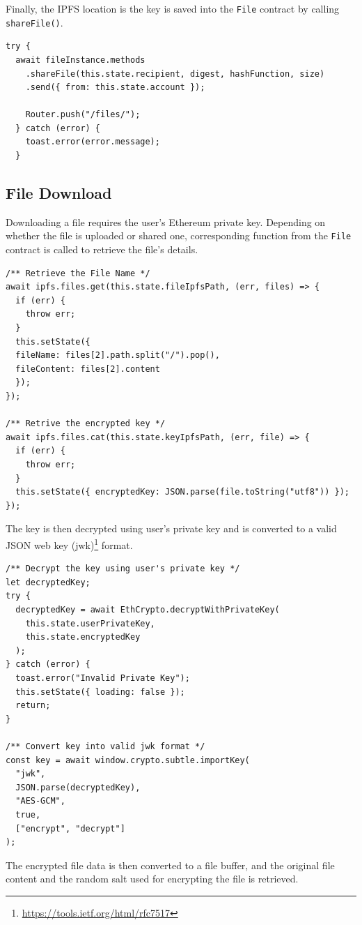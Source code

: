 \documentclass[]{article}
\begin{document}
		Finally, the IPFS location is the key is saved into the \texttt{File} contract by calling \texttt{shareFile()}.
		
\begin{verbatim}
try {
  await fileInstance.methods
    .shareFile(this.state.recipient, digest, hashFunction, size)
    .send({ from: this.state.account });

    Router.push("/files/");
  } catch (error) {
    toast.error(error.message);
  }
\end{verbatim}
		
		\newpage
		\subsection{File Download}
		Downloading a file requires the user's Ethereum private key. Depending on whether the file is uploaded or shared one, corresponding function from the \texttt{File} contract is called to retrieve the file's details.
		
\begin{verbatim}
/** Retrieve the File Name */
await ipfs.files.get(this.state.fileIpfsPath, (err, files) => {
  if (err) {
    throw err;
  }
  this.setState({
  fileName: files[2].path.split("/").pop(),
  fileContent: files[2].content
  });
});

/** Retrive the encrypted key */
await ipfs.files.cat(this.state.keyIpfsPath, (err, file) => {
  if (err) {
    throw err;
  }
  this.setState({ encryptedKey: JSON.parse(file.toString("utf8")) });
});
\end{verbatim}
		
		The key is then decrypted using user's private key and is converted to a valid JSON web key (jwk)\footnote{\url{https://tools.ietf.org/html/rfc7517}} format.
		
\begin{verbatim}
/** Decrypt the key using user's private key */
let decryptedKey;
try {
  decryptedKey = await EthCrypto.decryptWithPrivateKey(
    this.state.userPrivateKey,
    this.state.encryptedKey
  );
} catch (error) {
  toast.error("Invalid Private Key");
  this.setState({ loading: false });
  return;
}

/** Convert key into valid jwk format */
const key = await window.crypto.subtle.importKey(
  "jwk",
  JSON.parse(decryptedKey),
  "AES-GCM",
  true,
  ["encrypt", "decrypt"]
);
\end{verbatim}

		The encrypted file data is then converted to a file buffer, and the original file content and the random salt used for encrypting the file is retrieved.
		
\end{document}
